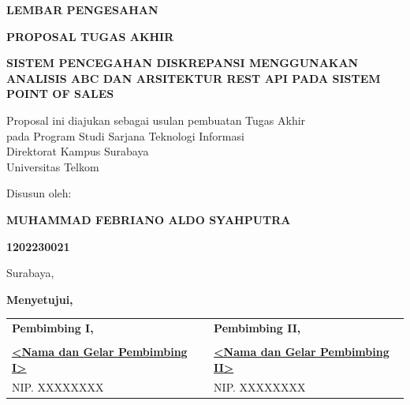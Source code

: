 \documentclass[11pt, a4paper]{article}
\begin{document}
\newpage
{}
\setcounter{page}{2}

\begin{center}
    \singlespacing
    {\large \textbf{LEMBAR PENGESAHAN}\par}
    \vspace{0.3cm}
    {\large \textbf{PROPOSAL TUGAS AKHIR}\par}
    \vspace{0.6cm}
    {\fontsize{12pt}{16pt}\selectfont \textbf{SISTEM PENCEGAHAN DISKREPANSI MENGGUNAKAN ANALISIS ABC DAN ARSITEKTUR REST API PADA SISTEM POINT OF SALES}\par}
    
    \vspace{1.0cm}
    {\normalsize Proposal ini diajukan sebagai usulan pembuatan Tugas Akhir\\
    pada Program Studi Sarjana Teknologi Informasi\\
    Direktorat Kampus Surabaya\\
    Universitas Telkom\par}
    
    \vspace{0.8cm}
    {\normalsize Disusun oleh:\par}
    \vspace{0.2cm}
    {\textbf{MUHAMMAD FEBRIANO ALDO SYAHPUTRA}\par}
    {\textbf{1202230021}\par}
    
    \vspace{1.0cm}
    Surabaya, \dotfill\par
    \vspace{0.2cm}
    \textbf{Menyetujui,}\par
    \vspace{0.8cm}
    
    \begin{tabularx}{\textwidth}{X c X}
    \centering \textbf{Pembimbing I,} & & \centering \textbf{Pembimbing II,} \tabularnewline
    \vspace{2.2cm} & & \vspace{2.2cm} \tabularnewline
    \centering \underline{\textbf{<Nama dan Gelar Pembimbing I>}} & & \centering \underline{\textbf{<Nama dan Gelar Pembimbing II>}} \tabularnewline
    \centering NIP. XXXXXXXX & & \centering NIP. XXXXXXXX \tabularnewline
    \end{tabularx}
    

\end{center}
\end{document}
